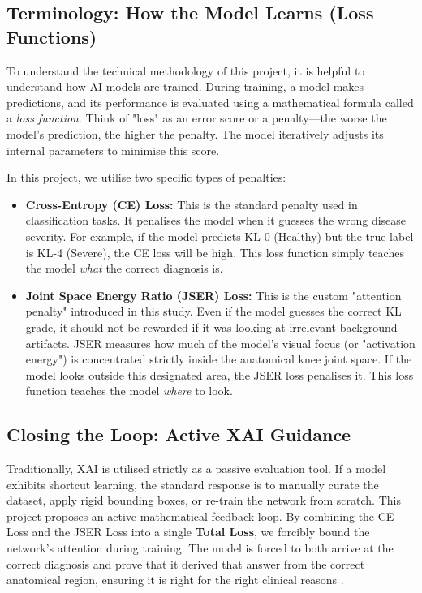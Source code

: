 \documentclass[conference]{IEEEtran}
\begin{document}
\subsection{Terminology: How the Model Learns (Loss Functions)}
To understand the technical methodology of this project, it is helpful to understand how AI models are trained. During training, a model makes predictions, and its performance is evaluated using a mathematical formula called a \textit{loss function}. Think of "loss" as an error score or a penalty—the worse the model's prediction, the higher the penalty. The model iteratively adjusts its internal parameters to minimise this score.

In this project, we utilise two specific types of penalties:
\begin{itemize}
  \item \textbf{Cross-Entropy (CE) Loss:} This is the standard penalty used in classification tasks. It penalises the model when it guesses the wrong disease severity. For example, if the model predicts KL-0 (Healthy) but the true label is KL-4 (Severe), the CE loss will be high. This loss function simply teaches the model \textit{what} the correct diagnosis is.
  \item \textbf{Joint Space Energy Ratio (JSER) Loss:} This is the custom "attention penalty" introduced in this study. Even if the model guesses the correct KL grade, it should not be rewarded if it was looking at irrelevant background artifacts. JSER measures how much of the model's visual focus (or "activation energy") is concentrated strictly inside the anatomical knee joint space. If the model looks outside this designated area, the JSER loss penalises it. This loss function teaches the model \textit{where} to look.
\end{itemize}

\subsection{Closing the Loop: Active XAI Guidance}
Traditionally, XAI is utilised strictly as a passive evaluation tool. If a model exhibits shortcut learning, the standard response is to manually curate the dataset, apply rigid bounding boxes, or re-train the network from scratch. This project proposes an active mathematical feedback loop. By combining the CE Loss and the JSER Loss into a single \textbf{Total Loss}, we forcibly bound the network's attention during training. The model is forced to both arrive at the correct diagnosis and prove that it derived that answer from the correct anatomical region, ensuring it is right for the right clinical reasons \cite{ross2017}.
\end{document}
